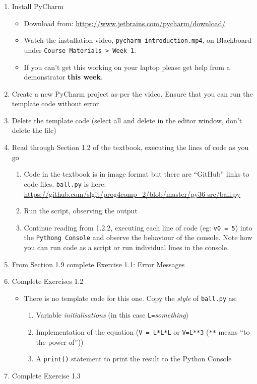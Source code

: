 \documentclass{lab}
\begin{document}
\begin{enumerate}
\item Install PyCharm
	\begin{itemize}
		\item Download from: \url{https://www.jetbrains.com/pycharm/download/}
		\item Watch the installation video, \texttt{pycharm introduction.mp4}, on Blackboard under \texttt{Course Materials > Week 1}.
		\item If you can't get this working on your laptop please get help from a demonstrator \textbf{this week}.
	\end{itemize}
\item Create a new PyCharm project as-per the video. Ensure that you can run the template code without error
\item Delete the template code (select all and delete in the editor window, don't delete the file)
\item Read through Section 1.2 of the textbook, executing the lines of code as you go
	\begin{enumerate}
		\item Code in the textbook is in image format but there are ``GitHub'' links to code files. \texttt{ball.py} is here: \url{https://github.com/slgit/prog4comp_2/blob/master/py36-src/ball.py}
		\item Run the script, observing the output
		\item Continue reading from 1.2.2, executing each line of code (eg: \texttt{v0 = 5}) into the \texttt{Pythong Console} and observe the behaviour of the console. Note how you can run code as a script or run individual lines in the console.
	\end{enumerate}
\item From Section 1.9 complete Exercise 1.1: Error Messages
\item Complete Exercises 1.2
	\begin{itemize}
		\item There is no template code for this one. Copy the \textit{style} of \texttt{ball.py} as:
			\begin{enumerate}
				\item Variable \textit{initialisations} (in this case \texttt{L=}\textit{something})
				\item Implementation of the equation (\texttt{V = L*L*L} or \texttt{V=L**3} (\texttt{**} means ``to the power of''))
				\item A \texttt{print()} statement to print the result to the Python Console
			\end{enumerate}
	\end{itemize}
\item Complete Exercise 1.3
\end{enumerate}
\end{document}
